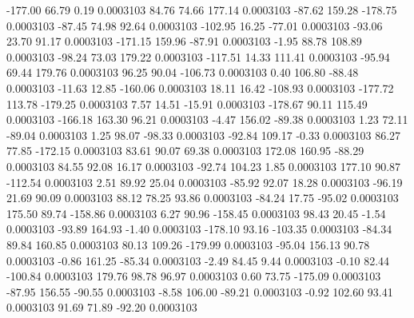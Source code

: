      -177.00       66.79        0.19     0.0003103
       84.76       74.66      177.14     0.0003103
      -87.62      159.28     -178.75     0.0003103
      -87.45       74.98       92.64     0.0003103
     -102.95       16.25      -77.01     0.0003103
      -93.06       23.70       91.17     0.0003103
     -171.15      159.96      -87.91     0.0003103
       -1.95       88.78      108.89     0.0003103
      -98.24       73.03      179.22     0.0003103
     -117.51       14.33      111.41     0.0003103
      -95.94       69.44      179.76     0.0003103
       96.25       90.04     -106.73     0.0003103
        0.40      106.80      -88.48     0.0003103
      -11.63       12.85     -160.06     0.0003103
       18.11       16.42     -108.93     0.0003103
     -177.72      113.78     -179.25     0.0003103
        7.57       14.51      -15.91     0.0003103
     -178.67       90.11      115.49     0.0003103
     -166.18      163.30       96.21     0.0003103
       -4.47      156.02      -89.38     0.0003103
        1.23       72.11      -89.04     0.0003103
        1.25       98.07      -98.33     0.0003103
      -92.84      109.17       -0.33     0.0003103
       86.27       77.85     -172.15     0.0003103
       83.61       90.07       69.38     0.0003103
      172.08      160.95      -88.29     0.0003103
       84.55       92.08       16.17     0.0003103
      -92.74      104.23        1.85     0.0003103
      177.10       90.87     -112.54     0.0003103
        2.51       89.92       25.04     0.0003103
      -85.92       92.07       18.28     0.0003103
      -96.19       21.69       90.09     0.0003103
       88.12       78.25       93.86     0.0003103
      -84.24       17.75      -95.02     0.0003103
      175.50       89.74     -158.86     0.0003103
        6.27       90.96     -158.45     0.0003103
       98.43       20.45       -1.54     0.0003103
      -93.89      164.93       -1.40     0.0003103
     -178.10       93.16     -103.35     0.0003103
      -84.34       89.84      160.85     0.0003103
       80.13      109.26     -179.99     0.0003103
      -95.04      156.13       90.78     0.0003103
       -0.86      161.25      -85.34     0.0003103
       -2.49       84.45        9.44     0.0003103
       -0.10       82.44     -100.84     0.0003103
      179.76       98.78       96.97     0.0003103
        0.60       73.75     -175.09     0.0003103
      -87.95      156.55      -90.55     0.0003103
       -8.58      106.00      -89.21     0.0003103
       -0.92      102.60       93.41     0.0003103
       91.69       71.89      -92.20     0.0003103
